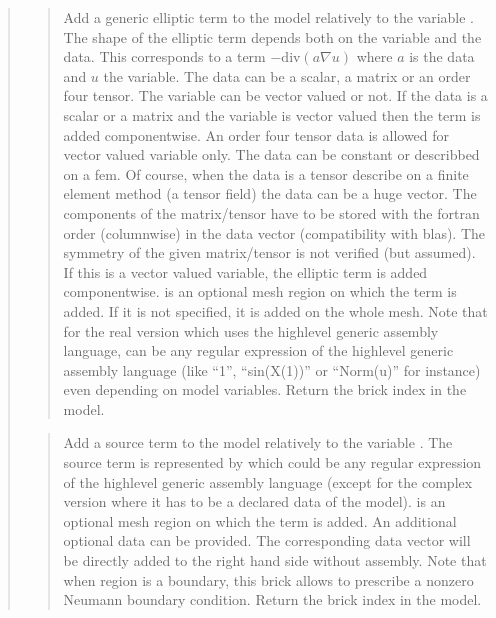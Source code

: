 \documentclass[a4paper,11pt,english]{sphinxmanual}
\begin{document}
\begin{quote}
\sphinxAtStartPar
{}
\begin{quote}

\sphinxAtStartPar
Add a generic elliptic term to the model relatively to the variable .
The shape of the elliptic term depends both on the variable and the data.
This corresponds to a term
\(-\text{div}(a\nabla u)\)
where \(a\) is the data and \(u\) the variable. The data can be
a scalar,
a matrix or an order four tensor. The variable can be vector valued or
not. If the data is a scalar or a matrix and the variable is vector
valued then the term is added componentwise. An order four tensor data
is allowed for vector valued variable only. The data can be constant or
describbed on a fem. Of course, when the data is a tensor describe on a
finite element method (a tensor field) the data can be a huge vector.
The components of the matrix/tensor have to be stored with the fortran
order (columnwise) in the data vector (compatibility with blas). The
symmetry of the given matrix/tensor is not verified (but assumed). If
this is a vector valued variable, the elliptic term is added
componentwise.  is an optional mesh region on which the term is
added. If it is not specified, it is added on the whole mesh. Note that
for the real
version which uses the high\sphinxhyphen{}level generic assembly language, 
can be any regular expression of the high\sphinxhyphen{}level generic assembly
language (like “1”, “sin(X(1))” or “Norm(u)” for instance) even
depending on model variables. Return the
brick index in the model.
\end{quote}

\sphinxAtStartPar
{}
\begin{quote}

\sphinxAtStartPar
Add a source term to the model relatively to the variable .
The source term is
represented by  which could be any regular expression of the
high\sphinxhyphen{}level generic assembly language (except for the complex version
where it has to be a declared data of the model).
 is an optional mesh region
on which the term is added. An additional optional data 
can be provided. The corresponding data vector will be directly added
to the right hand side without assembly. Note that when region is a
boundary, this brick allows to prescribe a nonzero Neumann boundary
condition. Return the brick index in the model.
\end{quote}


\end{quote}
\end{document}
